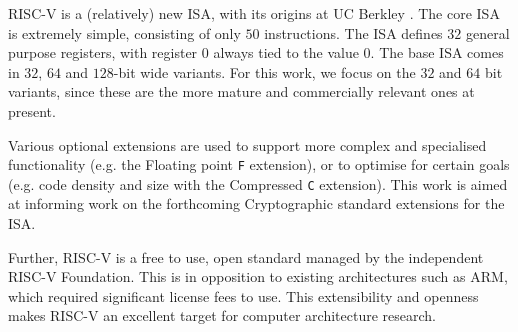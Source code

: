 
RISC-V is a (relatively) new ISA, with its origins at UC Berkley
\cite{riscv:1}.
The core ISA is extremely simple, consisting of only $50$ instructions.
The ISA defines $32$ general purpose registers, with register $0$ always
tied to the value $0$.
The base ISA comes in $32$, $64$ and $128$-bit wide variants.
For this work, we focus on the $32$ and $64$ bit variants, since these
are the more mature and commercially relevant ones at present.

Various optional extensions are used to support more complex and specialised
functionality (e.g. the Floating point {\tt F} extension),
or to optimise for certain goals (e.g. code density and size
with the Compressed {\tt C} extension).
This work is aimed at informing work on the forthcoming Cryptographic
standard extensions for the ISA.

Further, RISC-V is a free to use, open standard managed by the independent
RISC-V Foundation.
This is in opposition to existing architectures such as ARM, which required
significant license fees to use.
This extensibility and openness makes RISC-V an excellent target for
computer architecture research.


